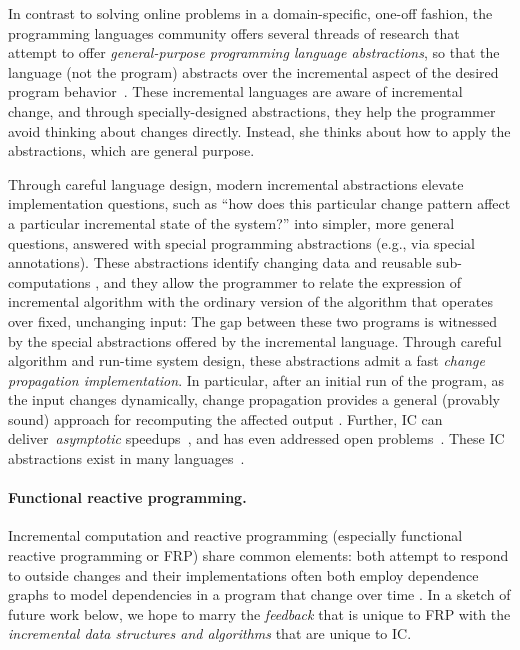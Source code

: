 \documentclass{purple}
\begin{document}
In contrast to solving online problems in a domain-specific, one-off
fashion, the programming languages community offers several threads of
research that attempt to offer \emph{general-purpose programming
  language abstractions}, so that the language (not the program)
abstracts over the incremental aspect of the desired program behavior~\cite{RamalingamRe93,RamalingamRe96,DemersReTe81,RepsTe88,LiuTeitelbaum95,LiuStTe98,Acar09,Guo2011}.
%
These incremental languages are aware of incremental change, and
through specially-designed abstractions, they help the programmer
avoid thinking about changes directly.  Instead, she thinks about how
to apply the abstractions, which are general purpose.

Through careful language design, modern incremental abstractions
elevate implementation questions, such as ``how does this
  particular change pattern affect a particular incremental state of
  the system?'' into simpler, more general questions, answered with
special programming abstractions (e.g., via special annotations).
%
These abstractions identify changing data and reusable
sub-computations \citep{AcarAhBl08,NominalAdapton2015-arxiv-version,Adapton2014,HammerAcCh09,Mitschke2014},
%
and they allow the programmer to relate
the expression of incremental algorithm with the ordinary version of
the algorithm that operates over fixed, unchanging input: The gap
between these two programs is witnessed by the special abstractions
offered by the incremental language.
%
Through careful algorithm and run-time system design, 
these abstractions admit a fast \emph{change propagation implementation}.
%
In particular, after an initial run of the program, as the input changes dynamically,
change propagation provides a general (provably sound) approach for
recomputing the affected output
\citep{AcarBlBlTa06,AcarLW09,NominalAdapton2015-arxiv-version}.
Further,
IC can deliver~\emph{asymptotic}
speedups~\citep{AcarIhMeSu07,HammerAcRaGh07,AcarIhMeSu08,AcarBlTaTu08,AcarAhBl08,Acar09,SumerAcIhMe11b},
and has even addressed open problems~\citep{AcarCoHuTu10}.
%
These IC abstractions exist in many languages~\citep{Shankar07,
  HammerAcRaGh07, HammerAc08, HammerAcCh09,
  Chen14:implicit}.


\paragraph{Functional reactive programming.}
%
Incremental computation and reactive programming (especially
functional reactive programming or FRP) share common elements: both
attempt to respond to outside changes and their implementations often
both employ dependence graphs to model dependencies in a program that
change over time
\citep{Cooper06embeddingdynamic,DBLP:conf/icfp/KrishnaswamiB11,Czaplicki2013AFR}.
%
In a sketch of future work below, we hope to marry the \emph{feedback}
that is unique to FRP with the \emph{incremental data structures and
  algorithms} that are unique to IC.
\end{document}
